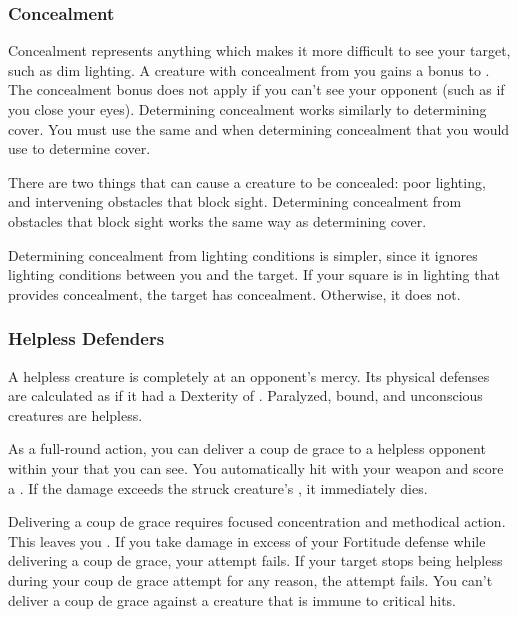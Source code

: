         \subsubsection{Concealment}\label{Concealment}
            Concealment represents anything which makes it more difficult to see your target, such as dim lighting. A creature with concealment from you gains a  bonus to . The concealment bonus does not apply if you can't see your opponent (such as if you close your eyes).
            Determining concealment works similarly to determining cover.
            You must use the same  and  when determining concealment that you would use to determine cover.

             There are two things that can cause a creature to be concealed: poor lighting, and intervening obstacles that block sight.
            Determining concealment from obstacles that block sight works the same way as determining cover.

            Determining concealment from lighting conditions is simpler, since it ignores lighting conditions between you and the target.
            If your  square is in lighting that provides concealment, the target has concealment.
            Otherwise, it does not.

        \subsubsection{Helpless Defenders}
            A helpless creature is completely at an opponent's mercy.
            Its physical defenses are calculated as if it had a Dexterity of .
            Paralyzed, bound, and unconscious creatures are helpless.

            \label{Coup de Grace} As a full-round action, you can deliver a coup de grace to a helpless opponent within your  that you can see.
            You automatically hit with your weapon and score a . If the damage exceeds the struck creature's , it immediately dies.

            Delivering a coup de grace requires focused concentration and methodical action. This leaves you . If you take damage in excess of your Fortitude defense while delivering a coup de grace, your attempt fails.
            If your target stops being helpless during your coup de grace attempt for any reason, the attempt fails.
            You can't deliver a coup de grace against a creature that is immune to critical hits.

